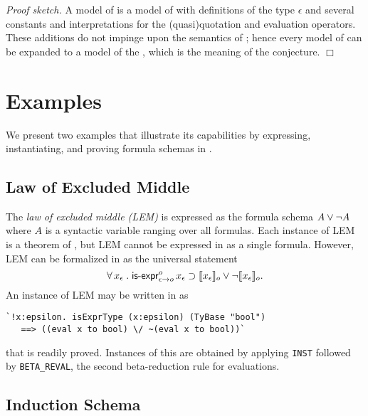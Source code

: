 \documentclass[fleqn]{llncs}
\begin{document}
\noindent
\emph{Proof sketch.}  A model of {\HLQE} is a model of {\HL} with
definitions of the type $\epsilon$ and several constants and
interpretations for the (quasi)quotation and evaluation operators.
These additions do not impinge upon the semantics of {\HL}; hence
every model of {\HL} can be expanded to a model of the {\HLQE}, which
is the meaning of the conjecture. $\Box$

\section{Examples}\label{sec:examples}

We present two examples that illustrate its capabilities by expressing,
instantiating, and proving formula schemas in {\HLQE}.

\subsection{Law of Excluded Middle}

The \emph{law of excluded middle (LEM)} is expressed as the formula
schema $A \vee \neg A$ where $A$ is a syntactic variable ranging over
all formulas.  Each instance of LEM is a theorem of {\HOL}, but LEM
cannot be expressed in {\HOL} as a single formula.  However, LEM can
be formalized in {\churchqe} as the universal statement
\[\forall\, x_\epsilon \mathrel. 
\mbox{\sf is-expr}_{\epsilon \rightarrow o}^{o} \, x_\epsilon \supset
\llbracket x_\epsilon\rrbracket_o \vee \neg \llbracket x_\epsilon\rrbracket_o.\] An
instance of LEM may be written in {\HLQE} as
\begin{lstlisting}
`!x:epsilon. isExprType (x:epsilon) (TyBase "bool")
   ==> ((eval x to bool) \/ ~(eval x to bool))`
\end{lstlisting}
that is readily proved.  Instances of this are obtained by applying
\texttt{INST} followed by \texttt{BETA\_REVAL}, the second
beta-reduction rule for evaluations.

\subsection{Induction Schema}
\end{document}
